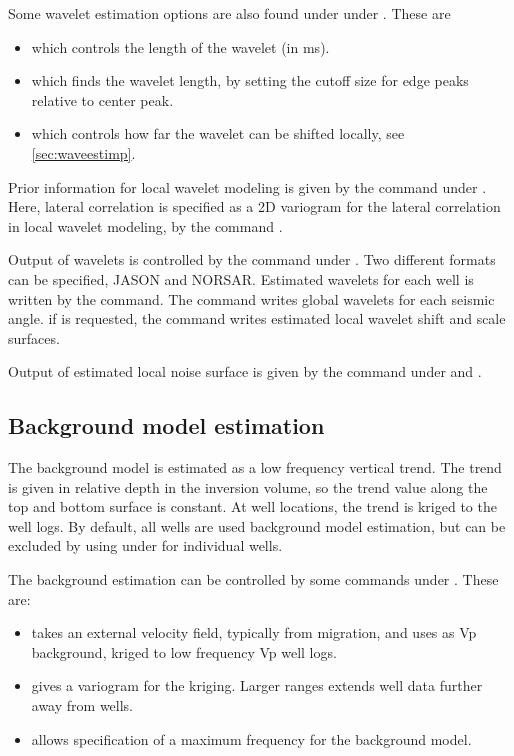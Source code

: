 Some wavelet estimation options are also found under  under . These are
\begin{itemize}
\item {} which controls the length of the wavelet (in ms).
\item {} which finds the wavelet
  length, by setting the cutoff size for edge peaks relative to center
  peak. 
\item {} which controls how far the wavelet
  can be shifted locally, see \autoref{sec:waveestimp}. 
\end{itemize}

Prior information for local wavelet modeling is given by the  command under . Here, lateral correlation is specified as  a 2D variogram for the lateral correlation in local wavelet modeling, by the command .

Output of wavelets is controlled by the  command under . 
Two different formats can be specified, JASON and NORSAR. Estimated wavelets for each well is written by the 
 command. The command  
writes global wavelets for each seismic angle. if  is requested, the command 
 writes estimated local wavelet shift and scale surfaces.

Output of estimated local noise surface is given by the command  under  and . 

\subsection{Background model estimation}
The background model is estimated as a low frequency vertical
trend. The trend is given in relative depth in the inversion volume,
so the trend value along the top and bottom surface is constant. At
well locations, the trend is kriged to the well logs. By default, all
wells are used background model estimation, but can be excluded by
using  under  for individual
wells. 

The background estimation can be controlled by some commands under
. These are: 
\begin{itemize}
\item {} takes an external velocity field, typically
  from migration, and uses as Vp background, kriged to low frequency
  Vp well logs. 
\item {} gives a variogram for the
  kriging. Larger ranges extends well data further away from wells. 
\item {} allows specification of a maximum frequency for
  the background model. 
\end{itemize}


